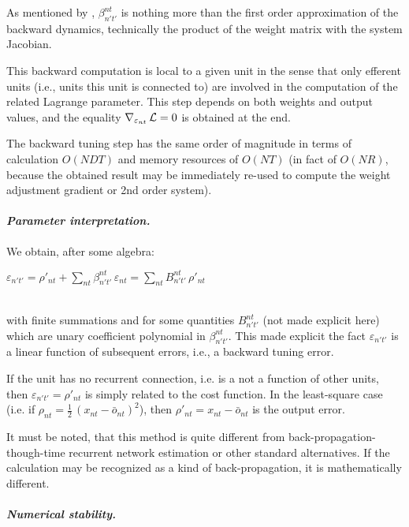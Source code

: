 As mentioned by \cite{cun_theoretical_1988}, $\beta_{n't'}^{nt}$ is nothing more than the first order approximation of the backward dynamics, technically the product of the weight matrix with the system Jacobian.

This backward computation is local to a given unit in the sense that only efferent units (i.e., units this unit is connected to) are involved in the computation of the related Lagrange parameter. This step depends on both weights and output values, and the equality $\nabla_{\varepsilon_{nt}} \, {\cal L} = 0$ is obtained at the end.

The backward tuning step has the same order of magnitude in terms of calculation $O(N D T)$  and memory resources of $O(N T)$ (in fact of $O(N R)$, because the obtained result may be immediately re-used to compute the weight adjustment gradient or 2nd order system). 

\paragraph{\em Parameter interpretation.}

We obtain, after some algebra:
\\\centerline{$\varepsilon_{n't'} = \rho'_{nt} + \sum_{nt} \beta_{n't'}^{nt} \, \varepsilon_{nt} = \sum_{nt} B_{n't'}^{nt} \, \rho'_{nt}$}\\ with finite summations and for some quantities $B_{n't'}^{nt}$ (not made explicit here) which are unary coefficient polynomial in $\beta_{n't'}^{nt}$. This made explicit the fact $\varepsilon_{n't'}$ is a linear function of subsequent errors, i.e., a backward tuning error.

If the unit has no recurrent connection, i.e. is a not a function of other units, then $\varepsilon_{n't'} = \rho'_{nt}$ is simply related to the cost function. In the least-square case (i.e. if $\rho_{nt} = \frac{1}{2} \, (x_{nt} - \bar{o}_{nt})^2$), then $\rho'_{nt} = x_{nt} - \bar{o}_{nt}$ is the output error.

It must be noted, that this method is quite different from back-propagation-though-time recurrent network estimation or other standard alternatives. If the calculation may be recognized as a kind of back-propagation, it is mathematically different.

\paragraph{\em Numerical stability.}

